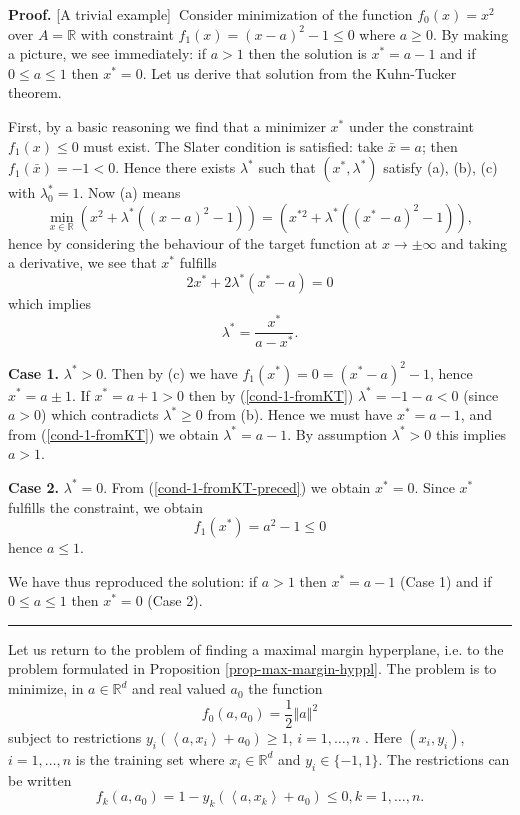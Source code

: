 \documentclass[11pt,twoside]{article}%
\theoremstyle{change}
\newenvironment{proof}[1][Proof]{\textbf{#1.} }{\ \rule{0.5em}{0.5em}}
\begin{document}
\begin{proof}
[A trivial example]\textbf{\ }Consider minimization of the function
$f_{0}(x)=x^{2}$ over $A=\mathbb{R}$ with constraint $f_{1}(x)=\left(
x-a\right)  ^{2}-1\leq0$ where $a\geq0$. By making a picture, we see
immediately: if $a>1$ then the solution is $x^{\ast}=a-1$ and if $0\leq
a\leq1$ then $x^{\ast}=0$. Let us derive that solution from the Kuhn-Tucker theorem.

First, by a basic reasoning we find that a minimizer $x^{\ast}$ under the
constraint $f_{1}(x)\leq0$ must exist. The Slater condition is satisfied: take
$\bar{x}=a$; then $f_{1}(\bar{x})=-1<0$. Hence there exists $\lambda^{\ast}$
such that $\left(  x^{\ast},\lambda^{\ast}\right)  $ satisfy (a), (b), (c)
with $\lambda_{0}^{\ast}=1$. Now (a) means
\[
\min_{x\in\mathbb{R}}\left(  x^{2}+\lambda^{\ast}\left(  \left(  x-a\right)
^{2}-1\right)  \right)  =\left(  x^{\ast2}+\lambda^{\ast}\left(  \left(
x^{\ast}-a\right)  ^{2}-1\right)  \right)  ,
\]
hence by considering the behaviour of the target function at $x\rightarrow
\pm\infty$ and taking a derivative, we see that $x^{\ast}$ fulfills
\begin{equation}
2x^{\ast}+2\lambda^{\ast}\left(  x^{\ast}-a\right)
=0\label{cond-1-fromKT-preced}%
\end{equation}
which implies
\begin{equation}
\lambda^{\ast}=\frac{x^{\ast}}{a-x^{\ast}}.\label{cond-1-fromKT}%
\end{equation}


\textbf{Case 1.} $\lambda^{\ast}>0$. Then by (c) we have $f_{1}(x^{\ast
})=0=\left(  x^{\ast}-a\right)  ^{2}-1$, hence $x^{\ast}=a\pm1$. If $x^{\ast
}=a+1>0$ then by (\ref{cond-1-fromKT}) $\lambda^{\ast}=-1-a<0$ (since $a>0$)
which contradicts $\lambda^{\ast}\geq0$ from (b). Hence we must have $x^{\ast
}=a-1$, and from (\ref{cond-1-fromKT}) we obtain $\lambda^{\ast}=a-1$. By
assumption $\lambda^{\ast}>0$ this implies $a>1$.

\textbf{Case 2.} $\lambda^{\ast}=0$. From (\ref{cond-1-fromKT-preced}) we
obtain $x^{\ast}=0$. Since $x^{\ast}$ fulfills the constraint, we obtain
\[
f_{1}(x^{\ast})=a^{2}-1\leq0
\]
hence $a\leq1$.

We have thus reproduced the solution: if $a>1$ then $x^{\ast}=a-1$ (Case 1)
and if $0\leq a\leq1$ then $x^{\ast}=0$ (Case 2).
\end{proof}

\bigskip\bigskip

Let us return to the problem of finding a maximal margin hyperplane, i.e. to
the problem formulated in Proposition \ref{prop-max-margin-hyppl}. The problem
is to minimize, in $a\in\mathbb{R}^{d}$ and real valued $a_{0}$ the function
\[
f_{0}(a,a_{0})=\frac{1}{2}\left\Vert a\right\Vert ^{2}%
\]
subject to restrictions $y_{i}\left(  \left\langle a,x_{i}\right\rangle
+a_{0}\right)  \geq1$, $i=1,\ldots,n$ . Here $(x_{i},y_{i})$, $i=1,\ldots,n $
is the training set where $x_{i}\in\mathbb{R}^{d}$ and $y_{i}\in\{-1,1\}$. The
restrictions can be written
\[
f_{k}(a,a_{0})=1-y_{k}\left(  \left\langle a,x_{k}\right\rangle +a_{0}\right)
\leq0,k=1,\ldots,n.
\]
\end{document}

